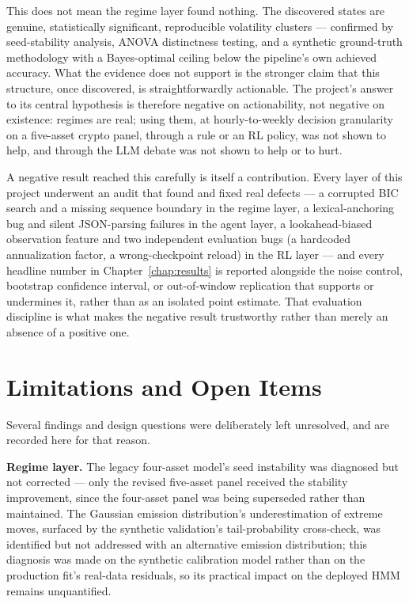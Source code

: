 This does not mean the regime layer found nothing. The discovered states are genuine, statistically significant, reproducible volatility clusters --- confirmed by seed-stability analysis, ANOVA distinctness testing, and a synthetic ground-truth methodology with a Bayes-optimal ceiling below the pipeline's own achieved accuracy. What the evidence does not support is the stronger claim that this structure, once discovered, is straightforwardly actionable. The project's answer to its central hypothesis is therefore negative on actionability, not negative on existence: regimes are real; using them, at hourly-to-weekly decision granularity on a five-asset crypto panel, through a rule or an RL policy, was not shown to help, and through the LLM debate was not shown to help or to hurt.

A negative result reached this carefully is itself a contribution. Every layer of this project underwent an audit that found and fixed real defects --- a corrupted BIC search and a missing sequence boundary in the regime layer, a lexical-anchoring bug and silent JSON-parsing failures in the agent layer, a lookahead-biased observation feature and two independent evaluation bugs (a hardcoded annualization factor, a wrong-checkpoint reload) in the RL layer --- and every headline number in Chapter~\ref{chap:results} is reported alongside the noise control, bootstrap confidence interval, or out-of-window replication that supports or undermines it, rather than as an isolated point estimate. That evaluation discipline is what makes the negative result trustworthy rather than merely an absence of a positive one.

\section{Limitations and Open Items}
\label{sec:conclusion-open-items}

Several findings and design questions were deliberately left unresolved, and are recorded here for that reason.

\textbf{Regime layer.} The legacy four-asset model's seed instability was diagnosed but not corrected --- only the revised five-asset panel received the stability improvement, since the four-asset panel was being superseded rather than maintained. The Gaussian emission distribution's underestimation of extreme moves, surfaced by the synthetic validation's tail-probability cross-check, was identified but not addressed with an alternative emission distribution; this diagnosis was made on the synthetic calibration model rather than on the production fit's real-data residuals, so its practical impact on the deployed HMM remains unquantified.

